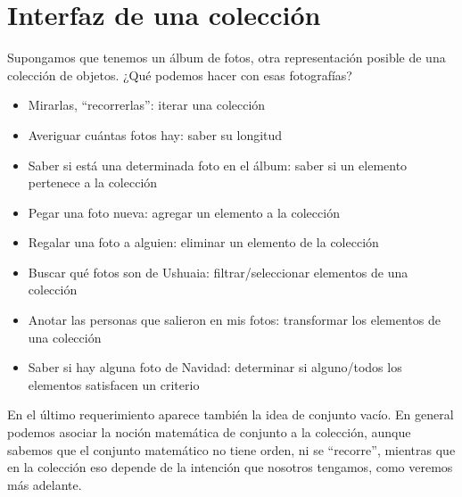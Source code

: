 \documentclass[a4paper,12pt]{book}
\begin{document}
\section{Interfaz de una colección}
Supongamos que tenemos un álbum de fotos, otra representación posible de una colección de objetos.
¿Qué podemos hacer con esas fotografías?
\\
\begin{itemize}
\item Mirarlas, ``recorrerlas'': iterar una colección
\item Averiguar cuántas fotos hay: saber su longitud
\item Saber si está una determinada foto en el álbum: saber si un elemento pertenece a la colección
\item Pegar una foto nueva: agregar un elemento a la colección
\item Regalar una foto a alguien: eliminar un elemento de la colección
\item Buscar qué fotos son de Ushuaia: filtrar/seleccionar elementos de una colección
\item Anotar las personas que salieron en mis fotos: transformar los elementos de una colección
\item Saber si hay alguna foto de Navidad: determinar si alguno/todos los elementos satisfacen 
un criterio
\end{itemize}
En el último requerimiento aparece también la idea de conjunto vacío. 
En general podemos asociar la noción matemática de conjunto a la colección, aunque sabemos que el conjunto
matemático no tiene orden, ni se ``recorre'', mientras que en la colección eso depende de la intención que
nosotros tengamos, como veremos más adelante.
\\
\end{document}
